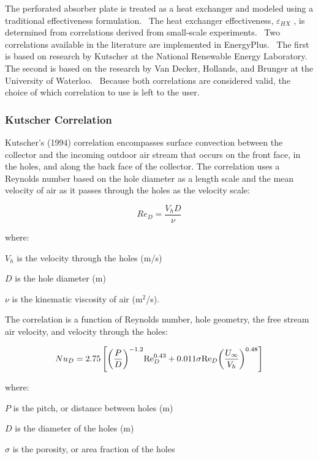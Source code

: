 The perforated absorber plate is treated as a heat exchanger and modeled using a traditional effectiveness formulation.~ The heat exchanger effectiveness, \({\varepsilon_{HX}}\) , is determined from correlations derived from small-scale experiments.~ Two correlations available in the literature are implemented in EnergyPlus.~ The first is based on research by Kutscher at the National Renewable Energy Laboratory. The second is based on the research by Van Decker, Hollands, and Brunger at the University of Waterloo.~ Because both correlations are considered valid, the choice of which correlation to use is left to the user.

\subsubsection{Kutscher Correlation}\label{kutscher-correlation}

Kutscher's (1994) correlation encompasses surface convection between the collector and the incoming outdoor air stream that occurs on the front face, in the holes, and along the back face of the collector. The correlation uses a Reynolds number based on the hole diameter as a length scale and the mean velocity of air as it passes through the holes as the velocity scale:

\begin{equation}
{Re_D} = \frac{{{V_h}D}}{\nu }
\end{equation}

where:

\({V_h}\) is the velocity through the holes (m/s)

\(D\) is the hole diameter (m)

\(\nu\) is the kinematic viscosity of air (m\(^{2}\)/s).

The correlation is a function of Reynolds number, hole geometry, the free stream air velocity, and velocity through the holes:

\begin{equation}
N{u_D} = 2.75\left[ {{{\left( {\frac{P}{D}} \right)}^{ - 1.2}}{\mathop{\rm Re}\nolimits}_D^{0.43} + 0.011\sigma {{{\mathop{\rm Re}\nolimits} }_D}{{\left( {\frac{{{U_\infty }}}{{{V_h}}}} \right)}^{0.48}}} \right]
\end{equation}

where:

\(P\) is the pitch, or distance between holes (m)

\(D\) is the diameter of the holes (m)

\(\sigma\) is the porosity, or area fraction of the holes


